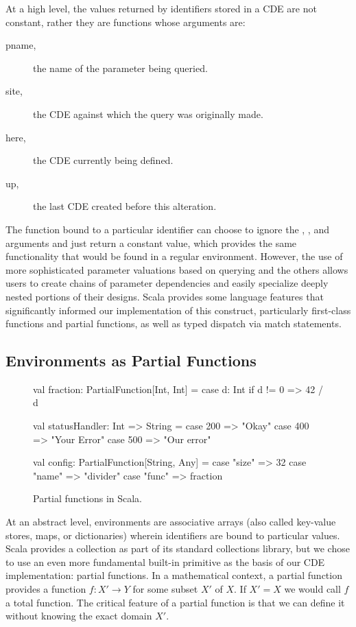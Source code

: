 At a high level, the values returned by identifiers stored in a CDE are not constant, rather they are functions whose arguments are:
\begin{description}
\item[pname,] the name of the parameter being queried.
\item[site,] the CDE against which the query was originally made.
\item[here,] the CDE currently being defined.
\item[up,] the last CDE created before this alteration.
\end{description}
The function bound to a particular identifier can choose to ignore the , , and  arguments and just return a constant value,
which provides the same functionality that would be found in a regular environment.
However, the use of more sophisticated parameter valuations based on querying  and the others
allows users to create chains of parameter dependencies and easily specialize deeply nested portions of their designs.
Scala provides some language features that significantly informed our implementation of this construct,
particularly first-class functions and partial functions, as well as typed dispatch via match statements.

\subsection{Environments as Partial Functions}

\begin{figure}
\centering
\begin{scala}
val fraction: PartialFunction[Int, Int] =
  { case d: Int if d != 0 => 42 / d }

val statusHandler: Int => String = {
  case 200 => "Okay"
  case 400 => "Your Error"
  case 500 => "Our error"
}

val config: PartialFunction[String, Any] = {
  case "size" => 32
  case "name" => "divider"
  case "func" => fraction
}

\end{scala} 
\caption{Partial functions in Scala.}
\label{fig:pf}
\end{figure}

At an abstract level, environments are associative arrays (also called key-value stores, maps, or dictionaries) wherein identifiers are bound to particular values.
Scala provides a  collection as part of its standard collections library, but we chose to use an even more fundamental built-in primitive as the basis of our CDE implementation:
partial functions.
In a mathematical context, a partial function provides a function  $f: X' \rightarrow Y$ for some subset $X'$ of $X$. If $X' = X$ we would call $f$ a total function.
The critical feature of a partial function is that we can define it without knowing the exact domain $X'$.

